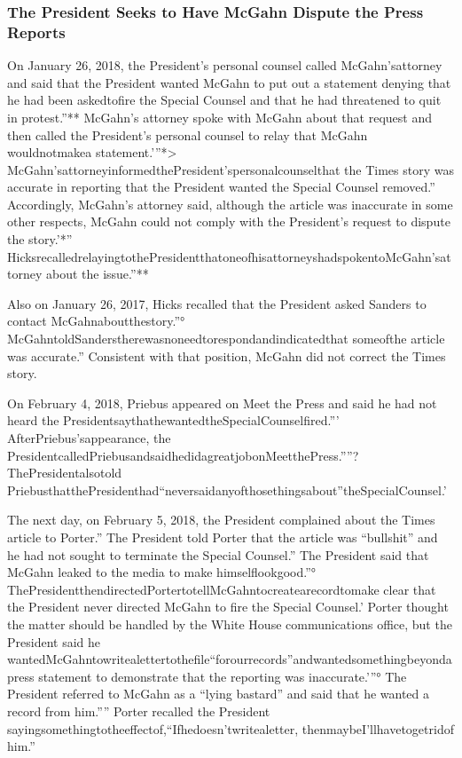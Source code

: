 \subsubsection{The President Seeks to Have McGahn Dispute the Press Reports}

On January 26, 2018, the President's personal counsel called McGahn'sattorney and said that the President wanted McGahn to put out a statement denying that he had been askedtofire the Special Counsel and that he had threatened to quit in protest.”**
McGahn's attorney spoke with McGahn about that request and then called the President's personal counsel to relay that McGahn wouldnotmakea statement.'”*>
McGahn'sattorneyinformedthePresident'spersonalcounselthat the Times story was accurate in reporting that the President wanted the Special Counsel removed.”
Accordingly, McGahn's attorney said, although the article was inaccurate in some other respects, McGahn could not comply with the President's request to dispute the story.'*” HicksrecalledrelayingtothePresidentthatoneofhisattorneyshadspokentoMcGahn'sattorney about the issue.”**

Also on January 26, 2017, Hicks recalled that the President asked Sanders to contact McGahnaboutthestory.”° McGahntoldSanderstherewasnoneedtorespondandindicatedthat someofthe article was accurate.”
Consistent with that position, McGahn did not correct the Times story.

On February 4, 2018, Priebus appeared on Meet the Press and said he had not heard the PresidentsaythathewantedtheSpecialCounselfired.”' AfterPriebus'sappearance, the PresidentcalledPriebusandsaidhedidagreatjobonMeetthePress.””?
ThePresidentalsotold PriebusthatthePresidenthad“neversaidanyofthosethingsabout”theSpecialCounsel.'

The next day, on February 5, 2018, the President complained about the Times article to Porter.”
The President told Porter that the article was “bullshit” and he had not sought to terminate the Special Counsel.”
The President said that McGahn leaked to the media to make himselflookgood.”°
ThePresidentthendirectedPortertotellMcGahntocreatearecordtomake clear that the President never directed McGahn to fire the Special Counsel.'
Porter thought the matter should be handled by the White House communications office, but the President said he wantedMcGahntowritealettertothefile“forourrecords”andwantedsomethingbeyondapress statement to demonstrate that the reporting was inaccurate.'”°
The President referred to McGahn as a “lying bastard” and said that he wanted a record from him.””
Porter recalled the President sayingsomethingtotheeffectof,“Ifhedoesn'twritealetter, thenmaybeI'llhavetogetridof him.”

